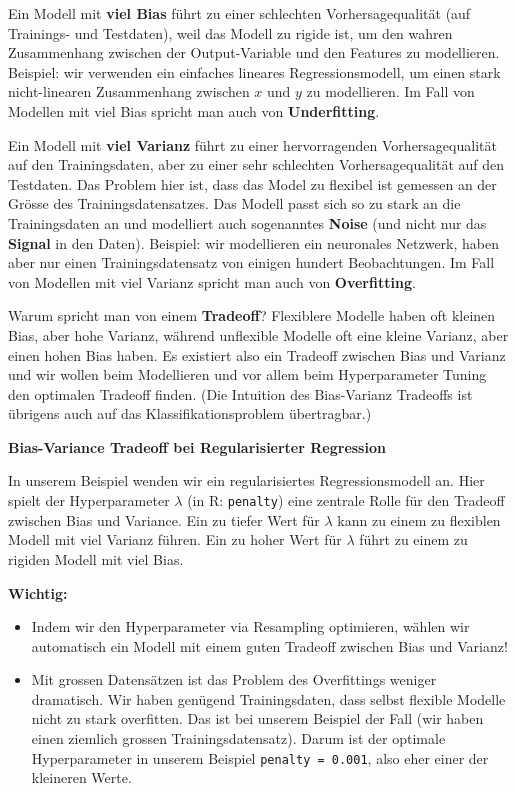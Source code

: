 \documentclass[
]{book}
\providecommand{\tightlist}{%
  \setlength{\itemsep}{0pt}\setlength{\parskip}{0pt}}
\begin{document}
Ein Modell mit \textbf{viel Bias} führt zu einer schlechten Vorhersagequalität (auf Trainings- und Testdaten), weil das Modell zu rigide ist, um den wahren Zusammenhang zwischen der Output-Variable und den Features zu modellieren. Beispiel: wir verwenden ein einfaches lineares Regressionsmodell, um einen stark nicht-linearen Zusammenhang zwischen \(x\) und \(y\) zu modellieren. Im Fall von Modellen mit viel Bias spricht man auch von \textbf{Underfitting}.

Ein Modell mit \textbf{viel Varianz} führt zu einer hervorragenden Vorhersagequalität auf den Trainingsdaten, aber zu einer sehr schlechten Vorhersagequalität auf den Testdaten. Das Problem hier ist, dass das Model zu flexibel ist gemessen an der Grösse des Trainingsdatensatzes. Das Modell passt sich so zu stark an die Trainingsdaten an und modelliert auch sogenanntes \textbf{Noise} (und nicht nur das \textbf{Signal} in den Daten). Beispiel: wir modellieren ein neuronales Netzwerk, haben aber nur einen Trainingsdatensatz von einigen hundert Beobachtungen. Im Fall von Modellen mit viel Varianz spricht man auch von \textbf{Overfitting}.

Warum spricht man von einem \textbf{Tradeoff}? Flexiblere Modelle haben oft kleinen Bias, aber hohe Varianz, während unflexible Modelle oft eine kleine Varianz, aber einen hohen Bias haben. Es existiert also ein Tradeoff zwischen Bias und Varianz und wir wollen beim Modellieren und vor allem beim Hyperparameter Tuning den optimalen Tradeoff finden. (Die Intuition des Bias-Varianz Tradeoffs ist übrigens auch auf das Klassifikationsproblem übertragbar.)

\textbf{Bias-Variance Tradeoff bei Regularisierter Regression}

In unserem Beispiel wenden wir ein regularisiertes Regressionsmodell an. Hier spielt der Hyperparameter \(\lambda\) (in R: \texttt{penalty}) eine zentrale Rolle für den Tradeoff zwischen Bias und Variance. Ein zu tiefer Wert für \(\lambda\) kann zu einem zu flexiblen Modell mit viel Varianz führen. Ein zu hoher Wert für \(\lambda\) führt zu einem zu rigiden Modell mit viel Bias.

\textbf{Wichtig:}

\begin{itemize}
\tightlist
\item
  Indem wir den Hyperparameter via Resampling optimieren, wählen wir automatisch ein Modell mit einem guten Tradeoff zwischen Bias und Varianz!
\item
  Mit grossen Datensätzen ist das Problem des Overfittings weniger dramatisch. Wir haben genügend Trainingsdaten, dass selbst flexible Modelle nicht zu stark overfitten. Das ist bei unserem Beispiel der Fall (wir haben einen ziemlich grossen Trainingsdatensatz). Darum ist der optimale Hyperparameter in unserem Beispiel \texttt{penalty\ =\ 0.001}, also eher einer der kleineren Werte.
\end{itemize}
\end{document}
